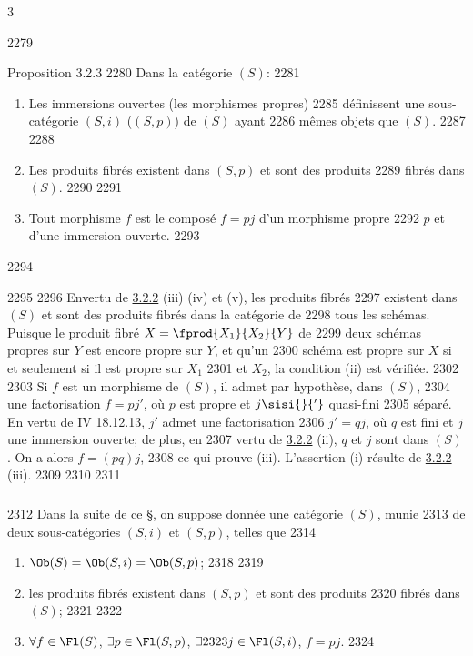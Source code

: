 3	\documentclass[10pt]{../fichiers-configuration-latex/smfart}
\begin{document}
  2279	\begin{enonce*}{Proposition 3.2.3}
  2280	Dans la catégorie $(S)$:
  2281	\begin{enumerate}
  2282	\renewcommand{\theenumi}{\roman{enumi}}
  2283	\renewcommand{\labelenumi}{(\theenumi)}
  2284	\item Les immersions ouvertes (\resp les morphismes propres)
  2285	définissent une sous-catégorie $(S,i)$ (\resp $(S,p)$) de $(S)$ ayant
  2286	mêmes objets que $(S)$.
  2287	
  2288	\item Les produits fibrés existent dans $(S,p)$ et sont des produits
  2289	fibrés dans $(S)$.
  2290	
  2291	\item Tout morphisme $f$ est le composé $f=pj$ d'un morphisme propre
  2292	$p$ et d'une immersion ouverte.
  2293	\end{enumerate}
  2294	\end{enonce*}
  2295	
  2296	En\pageoriginale vertu de \hyperref[XVII.prop3.2.2]{3.2.2} (iii) (iv) et (v), les produits fibrés
  2297	existent dans $(S)$ et sont des produits fibrés dans la catégorie de
  2298	tous les schémas. Puisque le produit fibré $X=\fprod{X_1}{X_2}{Y}$ de
  2299	deux schémas propres sur $Y$ est encore propre sur $Y$, et qu'un
  2300	schéma est propre sur $X$ si et seulement si il est propre sur $X_1$
  2301	et $X_2$, la condition (ii) est vérifiée.
  2302	
  2303	Si $f$ est un morphisme de $(S)$, il admet par hypothèse, dans $(S)$,
  2304	une factorisation $f=pj'$, où $p$ est propre et $j\sisi{}{'}$ quasi-fini
  2305	séparé. En vertu de \EGA IV 18.12.13, $j'$ admet une factorisation
  2306	$j'=qj$, où $q$ est fini et $j$ une immersion ouverte; de plus, en
  2307	vertu de \hyperref[XVII.prop3.2.2]{3.2.2} (ii), $q$ et $j$ sont dans $(S)$. On a alors $f=(pq)j$,
  2308	ce qui prouve (iii). L'assertion (i) résulte de \hyperref[XVII.prop3.2.2]{3.2.2} (iii).
  2309	
  2310	\setcounter{subsubsection}{3}
  2311	\subsubsection{}
  2312	Dans la suite de ce \S, on suppose donnée une catégorie $(S)$, munie
  2313	de deux sous-catégories $(S,i)$ et $(S,p)$, telles que
  2314	\begin{enumerate}
  2315	\renewcommand{\theenumi}{\roman{enumi}}
  2316	\renewcommand{\labelenumi}{(\theenumi)}
  2317	\item $\Ob(S)=\Ob(S,i)=\Ob(S,p)$;
  2318	
  2319	\item les produits fibrés existent dans $(S,p)$ et sont des produits
  2320	fibrés dans $(S)$;
  2321	
  2322	\item $\forall f\in \Fl(S)$, $\exists p\in \Fl(S,p)$, $\exists
  2323	j\in \Fl(S,i)$, $f=pj$.
  2324	\end{enumerate}
\end{document}
